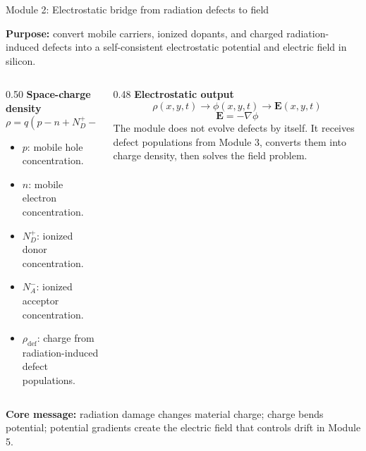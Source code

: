 \documentclass[aspectratio=169,9pt]{beamer}
\newcommand{\grad}{\nabla}
\newcommand{\E}{\bm{E}}
\begin{document}
\begin{frame}{Module 2: Electrostatic bridge from radiation defects to field}
\footnotesize
\vspace{-3mm}
\begin{bluebox}
\centering
\textbf{Purpose:} convert mobile carriers, ionized dopants, and charged radiation-induced defects into a self-consistent electrostatic potential and electric field in silicon.
\end{bluebox}

\vspace{1mm}
\begin{columns}[T,totalwidth=\textwidth]
\begin{column}{0.50\textwidth}
\textbf{Space-charge density}
\begin{equation*}
\boxed{\rho = q(p-n+N_D^+-N_A^-) + \rho_{\mathrm{def}}}
\end{equation*}
\begin{itemize}\setlength\itemsep{0.4mm}
\item \(p\): mobile hole concentration.
\item \(n\): mobile electron concentration.
\item \(N_D^+\): ionized donor concentration.
\item \(N_A^-\): ionized acceptor concentration.
\item \(\rho_{\mathrm{def}}\): charge from radiation-induced defect populations.
\end{itemize}
\end{column}
\begin{column}{0.48\textwidth}
\textbf{Electrostatic output}
\begin{equation*}
\boxed{\rho(x,y,t)\longrightarrow \phi(x,y,t)\longrightarrow \E(x,y,t)}
\end{equation*}
\begin{equation*}
\boxed{\E=-\grad \phi}
\end{equation*}
\small
The module does not evolve defects by itself.  It receives defect populations from Module 3, converts them into charge density, then solves the field problem.
\end{column}
\end{columns}

\vspace{1mm}
\begin{orangebox}
\centering\scriptsize
\textbf{Core message:} radiation damage changes material charge; charge bends potential; potential gradients create the electric field that controls drift in Module 5.
\end{orangebox}
\end{frame}
\end{document}
